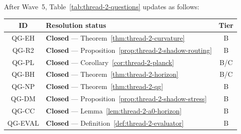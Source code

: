 \begin{remark}
\label{rmk:thread2-wave5-table}
After Wave~5, Table~\ref{tab:thread-2-questions} updates as follows:
\begin{center}
\small
\begin{tabular}{@{}clc@{}}
\toprule
\textbf{ID} & \textbf{Resolution status} & \textbf{Tier} \\
\midrule
QG-EH & \textbf{Closed} --- Theorem~\ref{thm:thread-2-curvature} & B \\
QG-R2 & \textbf{Closed} --- Proposition~\ref{prop:thread-2-shadow-routing} & B \\
QG-PL & \textbf{Closed} --- Corollary~\ref{cor:thread-2-planck} & B/C \\
QG-BH & \textbf{Closed} --- Theorem~\ref{thm:thread-2-horizon} & B/C \\
QG-NP & \textbf{Closed} --- Theorem~\ref{thm:thread-2-qg} & B \\
QG-DM & \textbf{Closed} --- Proposition~\ref{prop:thread-2-shadow-stress} & B \\
QG-CC & \textbf{Closed} --- Lemma~\ref{lem:thread-2-a0-horizon} & B \\
QG-EVAL & \textbf{Closed} --- Definition~\ref{def:thread-2-evaluator} & B \\
\bottomrule
\end{tabular}
\end{center}
\end{remark}